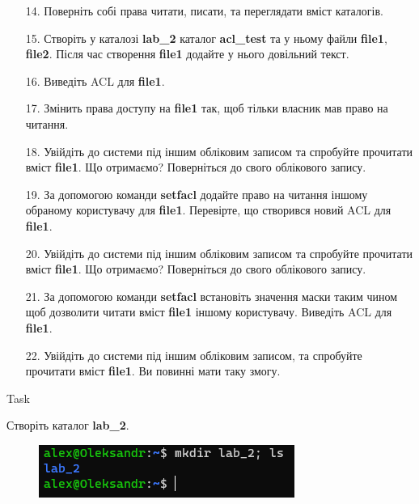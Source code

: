 \documentclass[a4paper,12pt]{article}
\newcommand{\RomanNumeralCaps}[1]{\MakeUppercase{\romannumeral #1}}
\begin{document}
\newpage
    \begin{enumerate}
    \item[14.] Поверніть собі права читати, писати, та переглядати вміст каталогів.
    \item[15.] Створіть у каталозі \textbf{lab\_2} каталог \textbf{acl\_test} та у ньому файли \textbf{file1}, \textbf{file2}. Після час створення \textbf{file1} додайте у 
    нього довільний текст.
    \item[16.] Виведіть ACL для \textbf{file1}.
    \item[17.] Змінить права доступу на \textbf{file1} так, щоб тільки власник мав право на читання.
    \item[18.] Увійдіть до системи під іншим обліковим записом та спробуйте прочитати вміст \textbf{file1}. Що отримаємо? Поверніться до свого облікового запису.
    \item[19.] За допомогою команди \textbf{setfacl} додайте право на читання іншому обраному користувачу для \textbf{file1}. Перевірте, що створився новий ACL для \textbf{file1}.
    \item[20.] Увійдіть до системи під іншим обліковим записом та спробуйте прочитати вміст \textbf{file1}. Що отримаємо? Поверніться до свого облікового запису.
    \item[21.] За допомогою команди \textbf{setfacl} встановіть значення маски таким чином щоб дозволити читати вміст \textbf{file1} іншому користувачу. Виведіть ACL для \textbf{file1}.
    \item[22.] Увійдіть до системи під іншим обліковим записом, та спробуйте прочитати вміст \textbf{file1}. Ви повинні мати таку змогу.
    \end{enumerate}

\newpage
    \begin{center}
        \Large{Task \RomanNumeralCaps{1}}
    \end{center}
    Створіть каталог \textbf{lab\_2}.
    \begin{figure}[h!]
        \begin{minipage}[h]{1\linewidth}
            \centering
            \includegraphics[width=0.5\linewidth]{Prt sc/Figure_1.png}  
        \end{minipage}
    \end{figure}
\end{document}
